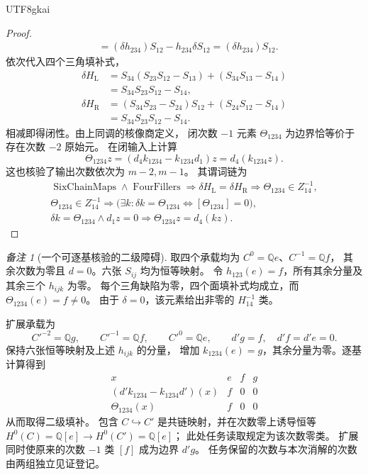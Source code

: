 \documentclass[12pt,a4paper,openany,notitlepage]{report}
\theoremstyle{plain}
\theoremstyle{definition}
\theoremstyle{remark}
\newtheorem{remark}[theorem]{备注}
\begin{document}
\begin{CJK*}{UTF8}{gkai}
\begin{proof}
\[\begin{aligned}
 &=(\delta h_{234})S_{12}
   -h_{234}\delta S_{12}
 =(\delta h_{234})S_{12}.
 \end{aligned}
\]
依次代入四个三角填补式，
\[
 \begin{aligned}
 \delta H_{\mathrm L}
 &=S_{34}(S_{23}S_{12}-S_{13})
   +(S_{34}S_{13}-S_{14})\\
 &=S_{34}S_{23}S_{12}-S_{14},\\
 \delta H_{\mathrm R}
 &=(S_{34}S_{23}-S_{24})S_{12}
   +(S_{24}S_{12}-S_{14})\\
 &=S_{34}S_{23}S_{12}-S_{14}.
 \end{aligned}
\]
相减即得闭性。由上同调的核像商定义，
闭次数 $-1$ 元素 $\Theta_{1234}$ 为边界恰等价于存在次数 $-2$ 原始元。
在闭输入上计算
\[
 \Theta_{1234}z
 =(d_4k_{1234}-k_{1234}d_1)z
 =d_4(k_{1234}z).
\]
这也核验了输出次数依次为 $m-2,m-1$。
其谓词链为
\[
 \begin{gathered}
 \operatorname{SixChainMaps}\land\operatorname{FourFillers}
 \Rightarrow\delta H_{\mathrm L}=\delta H_{\mathrm R}
 \Rightarrow\Theta_{1234}\in Z^{-1}_{14},\\
 \Theta_{1234}\in Z^{-1}_{14}
 \Rightarrow
 \bigl(\exists k:\delta k=\Theta_{1234}
       \Longleftrightarrow[\Theta_{1234}]=0\bigr),\\
 \delta k=\Theta_{1234}\land d_1z=0
 \Rightarrow\Theta_{1234}z=d_4(kz).
 \end{gathered}
\]
\end{proof}

\begin{remark}[一个可逐基核验的二级障碍]
\label{exp:hom:secondary-example}
取四个承载均为
$C^0=\mathbb Q e$、$C^{-1}=\mathbb Q f$，
其余次数为零且 $d=0$。六张 $S_{ij}$ 均为恒等映射。
令 $h_{123}(e)=f$，所有其余分量及其余三个 $h_{ijk}$ 为零。
每个三角缺陷为零，四个面填补式均成立，而
$\Theta_{1234}(e)=f\ne0$。
由于 $\delta=0$，该元素给出非零的 $H^{-1}_{14}$ 类。

扩展承载为
\[
 C'^{-2}=\mathbb Q g,\qquad
 C'^{-1}=\mathbb Q f,\qquad C'^0=\mathbb Q e,
 \qquad d'g=f,\quad d'f=d'e=0.
\]
保持六张恒等映射及上述 $h_{ijk}$ 的分量，
增加 $k_{1234}(e)=g$，其余分量为零。逐基计算得到
\[
 \begin{array}{c|ccc}
 x&e&f&g\\ \hline
 (d'k_{1234}-k_{1234}d')(x)&f&0&0\\
 \Theta_{1234}(x)&f&0&0
 \end{array}
\]
从而取得二级填补。
包含 $C\hookrightarrow C'$ 是共链映射，并在次数零上诱导恒等
$H^0(C)=\mathbb Q[e]\to H^0(C')=\mathbb Q[e]$；
此处任务读取规定为该次数零类。
扩展同时使原来的次数 $-1$ 类 $[f]$ 成为边界 $d'g$。
任务保留的次数与本次消解的次数由两组独立见证登记。
\end{remark}


\end{CJK*}
\end{document}
